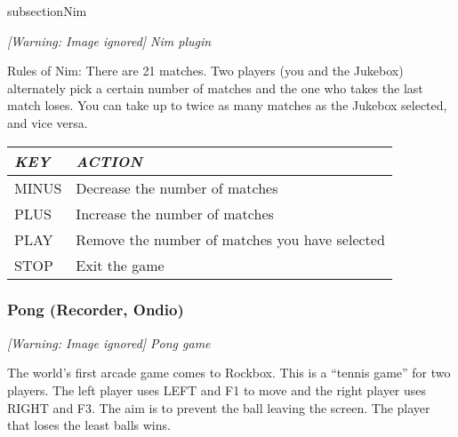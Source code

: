 subsection{Nim}
{\centering\itshape
  [Warning: Image ignored] %
 \newline
Nim plugin
\par}

Rules of Nim: There are 21 matches. Two players (you and the Jukebox)
alternately pick a certain number of matches and the one who takes the
last match loses.  You can take up to twice as many matches as the
Jukebox selected, and vice versa. 

\begin{center}\begin{tabular}{|p{2.257cm}|p{10.341001cm}|}
\hline
{\centering\bfseries\itshape
KEY
\par}
&
{\centering\bfseries\itshape
ACTION
\par}
\\\hline
{\centering
MINUS
\par}
&
Decrease the number of matches
\\\hline
{\centering
PLUS
\par}
&
Increase the number of matches
\\\hline
{\centering
PLAY
\par}
&
Remove the number of matches you have selected
\\\hline
{\centering
STOP
\par}
&
Exit the game
\\\hline
\end{tabular}\end{center}
\subsubsection{Pong (Recorder, Ondio)}
{\centering\itshape
  [Warning: Image ignored] %
 \newline
Pong game
\par}

The world's first arcade game comes to Rockbox.  This
is a ``tennis game'' for two players. The
left player uses LEFT and F1 to move and the right player uses RIGHT
and F3.  The aim is to prevent the ball leaving the screen.  The player
that loses the least balls wins.


